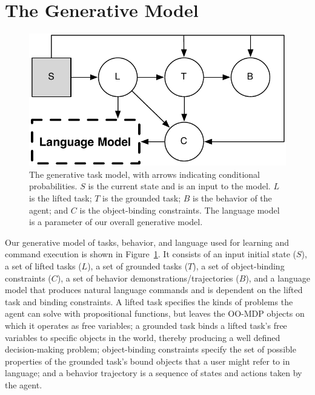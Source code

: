 \documentclass[conference]{IEEEtran}
\begin{document}
\section{The Generative Model}
\begin{figure}[tbp]
\begin{center}
\includegraphics[width=.7\columnwidth]{images/taskModel}
\caption{\small The generative task model, with arrows indicating conditional probabilities. $S$ is the current state and is an input to the model. $L$ is the lifted task; $T$ is the grounded task; $B$ is the behavior of the agent; and $C$ is the object-binding constraints. The language model is a parameter of our overall generative model.}
\label{fig:tm}
\end{center}
\end{figure}
Our generative model of tasks, behavior, and language used for learning and command execution is shown in Figure~\ref{fig:tm}. It consists of an input initial state ($S$), a set of lifted tasks ($L$), a set of grounded tasks ($T$), a set of object-binding constraints ($C$), a set of behavior demonstrations/trajectories ($B$), and a language model that produces natural language commands and is dependent on the lifted task and binding constraints. A lifted task specifies the kinds of problems the agent can solve with propositional functions, but leaves the OO-MDP objects on which it operates as free variables; a grounded task binds a lifted task's free variables to specific objects in the world, thereby producing a well defined decision-making problem; object-binding constraints specify the set of possible properties of the grounded task's bound objects that a user might refer to in language; and a behavior trajectory is a sequence of states and actions taken by the agent. 
\end{document}
